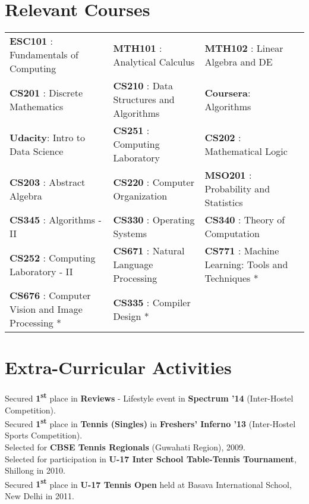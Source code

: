 \documentclass[a4paper]{norm-resume}
\begin{document}

\section{Relevant Courses}

\vspace{2mm} %
		
\begin{small}
	\begin{tabularx}{\textwidth}{X X l}
	{\textbf{ESC101} : Fundamentals of Computing} & {\textbf{MTH101} : Analytical Calculus} &{\textbf{MTH102} : Linear Algebra and DE}\\
	{\textbf{CS201} : Discrete Mathematics}&{\textbf{CS210 }: Data Structures and Algorithms} & {\textbf{Coursera}: Algorithms }\\
	{\textbf{Udacity}: Intro to Data Science } & {\textbf{CS251} : Computing Laboratory} &{\textbf{CS202} : Mathematical Logic} \\ 
	{\textbf{CS203} : Abstract Algebra} & {\textbf{CS220} : Computer Organization} & {\textbf{MSO201} : Probability and Statistics}\\
	{\textbf{CS345} : Algorithms - II}&{\textbf{CS330} : Operating Systems}&{\textbf{CS340} : Theory of Computation}\\
	{\textbf{CS252} : Computing Laboratory - II}&{\textbf{CS671} : Natural Language Processing} &{\textbf{CS771} : \scriptsize{Machine Learning: Tools and Techniques *}}\\
	{\textbf{CS676} : \scriptsize{Computer Vision and Image Processing *}}&{\textbf{CS335} : Compiler Design *}
	& {\hfill \footnotesize\emphasize{* - Ongoing}}\\
	\end{tabularx}
\end{small}	

\vspace{2mm}	%


\section{Extra-Curricular Activities}

\vspace{2mm} %
	
	Secured \textbf{1\textsuperscript{st}} place in \textbf{Reviews} - Lifestyle event in \textbf{Spectrum '14} (Inter-Hostel Competition).\\
	Secured \textbf{1\textsuperscript{st}} place in \textbf{Tennis (Singles)} in \textbf{Freshers' Inferno '13} (Inter-Hostel Sports Competition).\\	
	Selected for \textbf{CBSE Tennis Regionals} (Guwahati Region), 2009.\\
	Selected for participation in \textbf{U-17 Inter School Table-Tennis Tournament}, Shillong in 2010.\\
	Secured \textbf{1\textsuperscript{st}} place in \textbf{U-17 Tennis Open} held at Basava International School, New Delhi in 2011.\\
\end{document}

